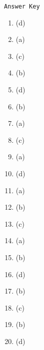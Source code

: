 \begin{center}
\texttt{Answer Key}
\begin{multicols}{5}
\begin{enumerate}
\item (d)
\item (a)
\item (c)
\item (b)
\item (d)
\item (b)
\item (a)
\item (c)
\item (a)
\item (d)
\item (a)
\item (b)
\item (c)
\item (a)
\item (b)
\item (d)
\item (b)
\item (c)
\item (b)
\item (d)
\end{enumerate}
\end{multicols}
\end{center}
